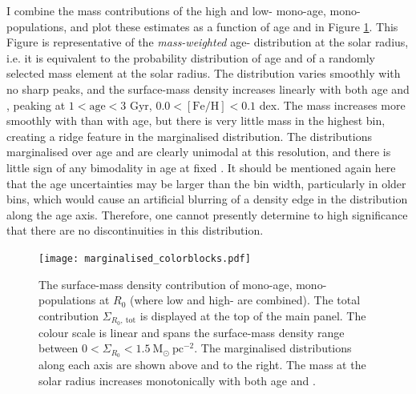 I combine the mass contributions of the high and low-\afe{} mono-age, mono-\feh{} populations, and plot these estimates as a function of age and \feh{} in Figure \ref{fig:margmass}. This Figure is representative of the \emph{mass-weighted} age-\feh{} distribution at the solar radius, i.e. it is equivalent to the probability distribution of age and \feh{} of a randomly selected mass element at the solar radius. The distribution varies smoothly with no sharp peaks, and the surface-mass density increases linearly with both age and \feh{}, peaking at $1 < \mathrm{age} < 3$ Gyr, $0.0 < \mathrm{[Fe/H]} < 0.1$ dex. The mass increases more smoothly with \feh{} than with age, but there is very little mass in the highest \feh{} bin, creating a ridge feature in the marginalised distribution. The distributions marginalised over age and \feh{} are clearly unimodal at this resolution, and there is little sign of any bimodality in age at fixed \feh{}. It should be mentioned again here that the age uncertainties may be larger than the bin width, particularly in older bins, which would cause an artificial blurring of a density edge in the distribution along the age axis. Therefore, one cannot presently determine to high significance that there are no discontinuities in this distribution.

\begin{figure}
 	\texttt{[image: marginalised\_colorblocks.pdf]}
 	\centering
     \caption[The surface-mass density contribution of mono-age mono-\feh{} populations at the solar radius from APOGEE DR12]{The surface-mass density contribution of mono-age, mono-\feh{} populations at $R_0$ (where low and high-\afe{} are combined). The total contribution $\Sigma_{R_0,\ \mathrm{tot}}$ is displayed at the top of the main panel. The colour scale is linear and spans the surface-mass density range between $0 < \Sigma_{R_0} < 1.5\ \mathrm{M_{\odot}\ pc^{-2}}$. The marginalised distributions along each axis are shown above and to the right. The mass at the solar radius increases monotonically with both age and \feh{}. }
     \label{fig:margmass}
\end{figure}


